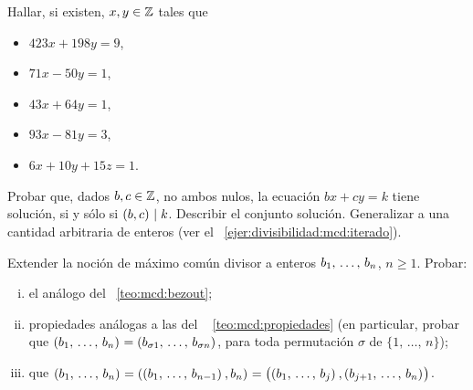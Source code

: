\begin{ejerDivisibilidad}
	Hallar, si existen, $x,y\in\mathbb{Z}$ tales que
	\begin{itemize}
		\item $423x+198y=9$,
		\item $71x-50y=1$,
		\item $43x+64y=1$,
		\item $93x-81y=3$,
		\item $6x+10y+15z=1$.
	\end{itemize}
\end{ejerDivisibilidad}

\begin{ejerDivisibilidad}
	Probar que, dados $b,c\in\mathbb{Z}$, no ambos nulos, la ecuaci\'on
	$bx+cy=k$ tiene soluci\'on, si y s\'olo si $\left({b,c}\right)_{}\mid k$.
	Describir el conjunto soluci\'on.%
	Generalizar a una cantidad arbitraria de enteros
	(ver el \ejername~\ref{ejer:divisibilidad:mcd:iterado}).
\end{ejerDivisibilidad}

\begin{ejerDivisibilidad}\label{ejer:divisibilidad:mcd:iterado}
	Extender la noci\'on de m\'aximo com\'un divisor a enteros
	$\lista b{n}$, $n\geq 1$. Probar:
	\begin{enumerate}[(i)]
		\item\label{item:ejer:mcd:bezout:bis}
			el an\'alogo del \teoname~\ref{teo:mcd:bezout};
		\item\label{item:ejer:mcd:propiedades:bis}
			propiedades an\'alogas a las del \teoname~%
			\ref{teo:mcd:propiedades} (en particular, probar que
			\begin{math}
				\mcd{\lista b{n}}=\mcd{b_{\sigma 1},%
					\,\dots,\,b_{\sigma n}}
			\end{math},
			para toda permutaci\'on $\sigma$ de
			$\{1,\,\dots,\,n\}$);
		\item\label{item:ejer:mcd:iterado}
			que
			\begin{math}
				\mcd{\lista b{n}}=\mcd{%
					\mcd{\lista b{n-1}},b_n}=
				\mcd{\mcd{\lista b{j}},\mcd{\lista[j+1] b{n}}}
			\end{math}.
	\end{enumerate}
\end{ejerDivisibilidad}

